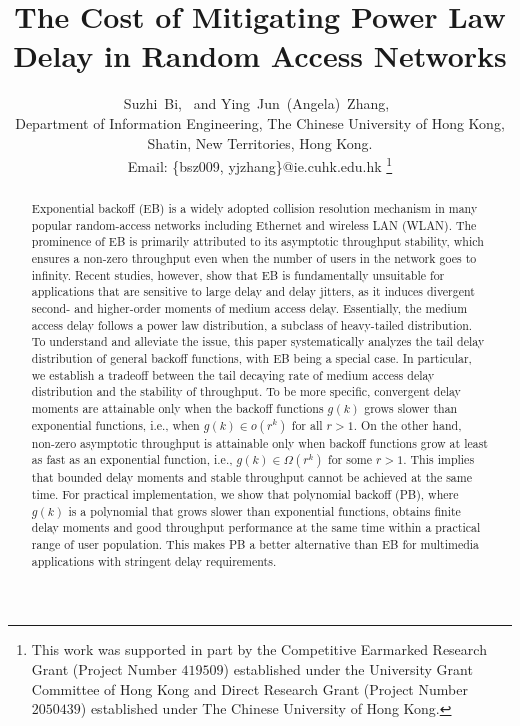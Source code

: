 \documentclass[journal]{IEEEtran}
\begin{document}
\title{The Cost of Mitigating Power Law Delay in Random Access Networks}

\author{Suzhi~Bi,~ and Ying~Jun~(Angela)~Zhang,~\\
Department of Information Engineering, The Chinese University of Hong
        Kong,\\Shatin, New Territories, Hong Kong. \\ Email: \{bsz009, yjzhang\}@ie.cuhk.edu.hk
        \thanks{This work was supported in part by the Competitive Earmarked Research Grant (Project Number $419509$) established under the University Grant Committee of Hong Kong and Direct Research Grant (Project Number $2050439$) established under The Chinese University of Hong Kong.}}
\maketitle
\vspace{-0.7in}
\begin{abstract}
Exponential backoff (EB) is a widely adopted collision resolution mechanism in many popular random-access networks including Ethernet and wireless LAN (WLAN). The prominence of EB is primarily attributed to its asymptotic throughput stability, which ensures a non-zero throughput even when the number of users in the network goes to infinity. Recent studies, however, show that EB is fundamentally unsuitable for applications that are sensitive to large delay and delay jitters, as it induces divergent second- and higher-order moments of medium access delay. Essentially, the medium access delay follows a power law distribution, a subclass of heavy-tailed distribution. To understand and alleviate the issue, this paper systematically analyzes the tail delay distribution of general backoff functions, with EB being a special case. In particular, we establish a tradeoff between the tail decaying rate of medium access delay distribution and the stability of throughput. To be more specific, convergent delay moments are attainable only when the backoff functions $g(k)$ grows slower than exponential functions, i.e., when $g(k)\in o\left(r^k\right)$ for all $r>1$. On the other hand, non-zero asymptotic throughput is attainable only when backoff functions grow at least as fast as an exponential function, i.e., $g(k)\in\Omega\left(r^k\right)$ for some $r>1$. This implies that bounded delay moments and stable throughput cannot be achieved at the same time. For practical implementation, we show that polynomial backoff (PB), where $g(k)$ is a polynomial that grows slower than exponential functions, obtains finite delay moments and good throughput performance at the same time within a practical range of user population. This makes PB a better alternative than EB for multimedia applications with stringent delay requirements.
\end{abstract}
\end{document}
